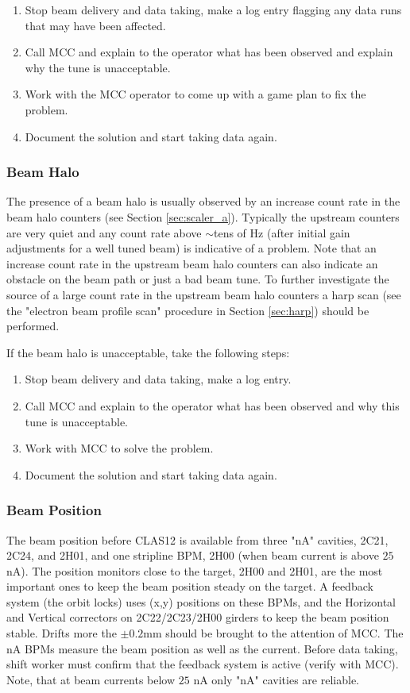 \documentclass[12pt]{article}
\begin{document}
\begin{enumerate}
\item Stop beam delivery and data taking, make a log entry flagging any data runs that may have been
affected.
\item Call MCC and explain to the operator what has been observed and explain why
the tune is unacceptable.
\item Work with the MCC operator to come up with a game plan to fix the problem.
\item Document the solution and start taking data again.
\end{enumerate}


\subsubsection{Beam Halo}
\indent

The presence of a beam halo is usually observed by an increase count rate in
the beam halo counters (see Section \ref{sec:scaler_a}). Typically
the upstream counters are very quiet and any count rate above $\sim$tens of Hz (after initial gain adjustments for a well tuned beam) is indicative
of a problem. Note that an increase count rate in the upstream beam halo counters
can also indicate an obstacle on the beam path or just a bad beam tune. To 
further investigate the source of a large count rate in the upstream beam halo
counters a harp scan (see the "electron beam profile scan" procedure in Section \ref{sec:harp}) should be performed. 

If the beam halo is unacceptable, take the following steps:

\begin{enumerate}
\item Stop beam delivery and data taking, make a log entry.
\item Call MCC and explain to the operator what has been observed and why this tune
is unacceptable.
\item Work with MCC to solve the problem.
\item Document the solution and start taking data again.
\end{enumerate}

\subsubsection{Beam Position}
\indent

The beam position before CLAS12 is available from three "nA" cavities, 2C21, 2C24, and 2H01, and one stripline BPM, 2H00 (when beam current is above $25$ nA). The position monitors close to the target, 2H00 and 2H01, are the most important ones to keep the beam position steady on the target. A feedback system (the orbit locks) uses (x,y) positions on these BPMs, and the Horizontal and Vertical correctors on 2C22/2C23/2H00 girders to keep the beam position stable. Drifts more the \( \pm 0.2 \)mm
should be brought to the attention of MCC. The nA BPMs measure the beam position as well as the current. Before data taking, shift worker must confirm that the feedback system is active (verify with MCC). Note, that at beam currents below $25$ nA only "nA" cavities are reliable. 
\end{document}
